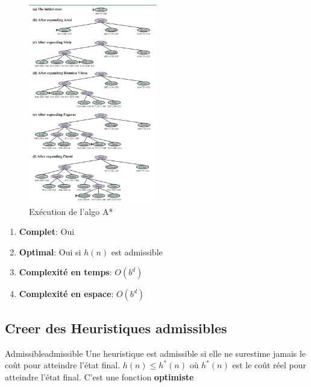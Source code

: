 \begin{figure}[H]
    \begin{center}
        \includegraphics[width=0.5\textwidth]{pictures/astar.png}
    \end{center}
    \caption{Exécution de l'algo A*}\label{fig:astar}
\end{figure}

\begin{remarks}\leavevmode
    \begin{enumerate}
        \item \textbf{Complet}: Oui
        \item \textbf{Optimal}: Oui si $h(n)$ est admissible
        \item \textbf{Complexité en temps}: $O(b^d)$
        \item \textbf{Complexité en espace}: $O(b^d)$
    \end{enumerate}
\end{remarks}

\subsection{Creer des Heuristiques admissibles} %
\label{sub:creer_des_heuristiques_admissibles}

\begin{definition}{Admissible}{admissible}
    Une heuristique est admissible si elle ne surestime jamais le coût pour atteindre l'état final. 
    \begin{math}
        h(n) \leq h^*(n) 
    \end{math} 
    où $h^*(n)$ est le coût réel pour atteindre l'état final. 
    C'est une fonction \textbf{optimiste}
\end{definition}

